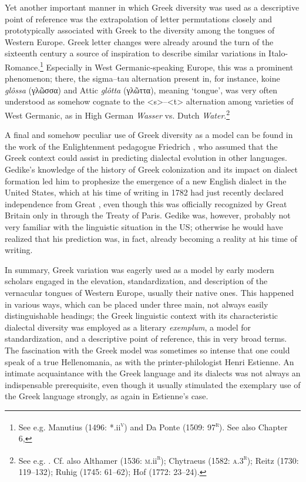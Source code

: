 Yet another important manner in which Greek diversity was used as a descriptive point of reference was the extrapolation of letter permutations closely and prototypically associated with Greek to the diversity among the tongues of Western Europe. Greek letter changes were already around the turn of the sixteenth century a source of inspiration to describe similar variations in Italo-Romance.\footnote{See e.g. Manutius (1496: *.ii\textsc{\textsuperscript{v}}) and Da Ponte (1509: 97\textsc{\textsuperscript{r}}). See also Chapter 6, } Especially in West Germanic-speaking Europe, this was a prominent phenomenon; there, the sigma–tau alternation present in, for instance, koine \textit{glôssa} (γλῶσσα) and Attic \textit{glôtta} (γλῶττα), meaning ‘tongue’, was very often understood as somehow cognate to the <s>–<t> alternation among varieties of West Germanic, as in High German \textit{Wasser} vs. Dutch \textit{Water}.\footnote{See e.g. \citet[21]{Mylius1612}. Cf. also Althamer (1536: \textsc{m}.ii\textsc{\textsuperscript{r}}); Chytraeus (1582: \textsc{a.3}\textsc{\textsuperscript{r}}); Reitz (1730: 119–132); Ruhig (1745: 61–62); Hof (1772: 23–24).}

A final and somehow peculiar use of Greek diversity as a model can be found in the work of the Enlightenment pedagogue Friedrich \citet[7]{Gedike1782}, who assumed that the Greek context could assist in predicting dialectal evolution in other languages. Gedike’s knowledge of the history of Greek colonization and its impact on dialect formation led him to prophesize the emergence of a new English dialect in the United States, which at his time of writing in 1782 had just recently declared independence from Great \citet{Britain1776}, even though this was officially recognized by Great Britain only in \citealt{September1783} through the Treaty of Paris. Gedike was, however, probably not very familiar with the linguistic situation in the US; otherwise he would have realized that his prediction was, in fact, already becoming a reality at his time of writing.

In summary, Greek variation was eagerly used as a model by early modern scholars engaged in the elevation, standardization, and description of the vernacular tongues of Western Europe, usually their native ones. This happened in various ways, which can be placed under three main, not always easily distinguishable headings; the Greek linguistic context with its characteristic dialectal diversity was employed as  a literary \textit{exemplum},  a model for standardization, and  a descriptive point of reference, this in very broad terms. The fascination with the Greek model was sometimes so intense that one could speak of a true Hellenomania, as with the printer-philologist Henri Estienne. An intimate acquaintance with the Greek language and its dialects was not always an indispensable prerequisite, even though it usually stimulated the exemplary use of the Greek language strongly, as again in Estienne’s case.

